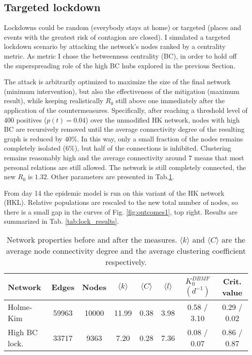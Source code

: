 \documentclass[DIV=12, BCOR=0pt]{scrartcl}  %
\begin{document}
	\subsection{Targeted lockdown}
	Lockdowns could be random (everybody stays at home) or targeted (places and events with the greatest risk of contagion are closed). I simulated a targeted lockdown scenario by attacking the network's nodes ranked by a centrality metric. As metric I chose the betweenness centrality (BC), in order to hold off the superspreading role of the high BC hubs explored in the previous Section.
	
	The attack is arbitrarily optimized to maximize the size of the final network (minimum intervention), but also the effectiveness of the mitigation (maximum result), while keeping realistically $R_0$ still above one immediately after the application of the countermeasures.
	Specifically, after reaching a threshold level of 400 positives ($p(t) = 0.04$) over the unmodified HK network, nodes with high BC are recursively removed until the average connectivity degree of the resulting graph is reduced by $ 40 \%$. 
	In this way, only a small fraction of the nodes remains completely isolated ($6 \%$), but half of the connections is inhibited. Clustering remains reasonably high and the average connectivity around $7$ means that most personal relations are still allowed. The network is still completely connected, the new $R_0$ is $1.32$. Other parameters are presented in Tab.\ref{tab:lock_networks}. 
	
	From day 14 the epidemic model is run on this variant of the HK network (HKL). Relative populations are rescaled to the new total number of nodes, so there is a small gap in the curves of Fig. \ref{fig:outcomes1}, top right.
	Results are summarized in Tab. \ref{tab:lock_results}.
	
	\begin{table}[h]
		\centering
		\caption{Network properties before and after the measures. $\langle k \rangle$ and $\langle C \rangle$ are the average node connectivity degree and the average clustering coefficient respectively.}
		\label{tab:lock_networks}
		\begin{tabular}{lccccccc}
			\toprule
			Network &  Edges &  Nodes & $\langle k \rangle$ & $\langle C \rangle$ & $\langle l \rangle$ & $K_0^{DBMF}$ $(d^{-1})$ & Crit. value \\
			\midrule
			Holme-Kim 		&  59963 &  10000 & 11.99 &  0.38 &  3.98 &  0.58 / 3.10 &   0.29 / 0.02 \\ 
			High BC lock.	&  33717 &   9363 &  7.20 &  0.28 &  7.36 &  0.08 / 0.07 &   0.86 / 0.87 \\
			
			\bottomrule
		\end{tabular}
	\end{table}
	
\end{document}
